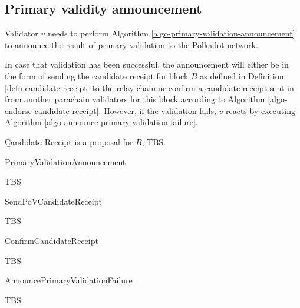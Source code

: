 \subsection{Primary validity announcement}
\label{sect-primary-validaty-announcement}
Validator $v$ needs to perform Algorithm \ref{algo-primary-validation-announcement} to announce the result of primary validation to the Polkadot network.

In case that validation has been successful, the announcement will either be in the form of sending the candidate receipt for block $B$ as defined in Definition \ref{defn-candidate-receipt} to the relay chain or confirm a candidate receipt sent in from another parachain validators for this block according to Algorithm \ref{algo-endorse-candidate-receipt}.
However, if the validation fails, $v$ reacts by executing Algorithm \ref{algo-announce-primary-validation-failure}.

\begin{definition}
  \label{defn-candidate-receipt}
        {\b Candidate Receipt} is a proposal for $B$, TBS.
\end{definition}

\begin{algorithm}
  \caption[PrimaryValidationAnnouncement]{\sc PrimaryValidationAnnouncement}
  \label{algo-primary-validation-announcement}
  \begin{algorithmic}[1]
    \Require{}
     \State TBS
  \end{algorithmic}
\end{algorithm}

\begin{algorithm}
  \caption[]{\sc SendPoVCandidateReceipt}
  \label{algo-send-candidate-receipt}
  \begin{algorithmic}[1]
    \Require{}

    \State TBS
  \end{algorithmic}
\end{algorithm}

\begin{algorithm}
  \caption[]{\sc ConfirmCandidateReceipt}
  \label{algo-endorse-candidate-receipt}
  \begin{algorithmic}[1]
    \Require{}

    \State TBS
  \end{algorithmic}
\end{algorithm}

\begin{algorithm}
  \caption[]{\sc AnnouncePrimaryValidationFailure}
  \label{algo-announce-primary-validation-failure}
  \begin{algorithmic}[1]
    \Require{}

    \State TBS
  \end{algorithmic}
\end{algorithm}

